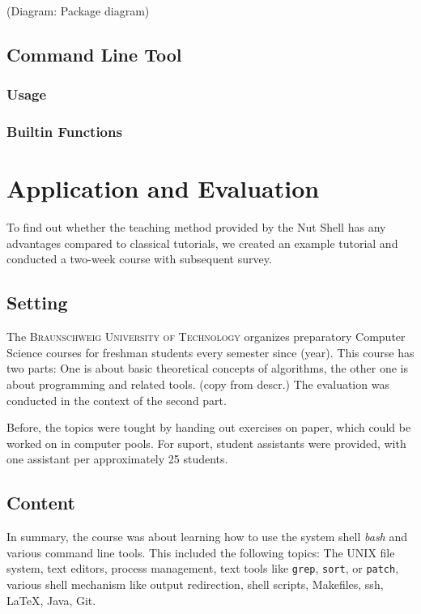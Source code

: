 \documentclass[twoside,parskip]{scrreprt}
\begin{document}
(Diagram: Package diagram)

\section{Command Line Tool}

\subsection{Usage}

\subsection{Builtin Functions}

\chapter{Application and Evaluation}

To find out whether the teaching method provided by the Nut Shell has any advantages compared to classical tutorials, we created an example tutorial and conducted a two-week course with subsequent survey.

\section{Setting}

The \textsc{Braunschweig University of Technology} organizes preparatory Computer Science courses for freshman students every semester since (year). This course has two parts: One is about basic theoretical concepts of algorithms, the other one is about programming and related tools. (copy from descr.) The evaluation was conducted in the context of the second part.

Before, the topics were tought by handing out exercises on paper, which could be worked on in computer pools. For suport, student assistants were provided, with one assistant per approximately 25 students.



\section{Content}

In summary, the course was about learning how to use the system shell \emph{bash} and various command line tools. This included the following topics: The UNIX file system, text editors, process management, text tools like \texttt{grep}, \texttt{sort}, or \texttt{patch}, various shell mechanism like output redirection, shell scripts, Makefiles, ssh, \LaTeX, Java, Git.
\end{document}
